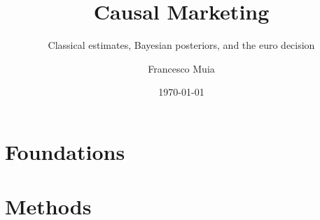 \documentclass[11pt, a4paper, twoside, openright, numbers=noenddot,
               chapterprefix=true, DIV=11, BCOR=8mm]{scrbook}
\title{Causal Marketing}
\subtitle{Classical estimates, Bayesian posteriors, and the euro decision}
\author{Francesco Muia}
\date{\today}
\begin{document}
\frontmatter


\tableofcontents
\listoffigures
\listoftables






\mainmatter

\part{Foundations}




%
\setcounter{part}{1}
\part{Methods}
\end{document}

